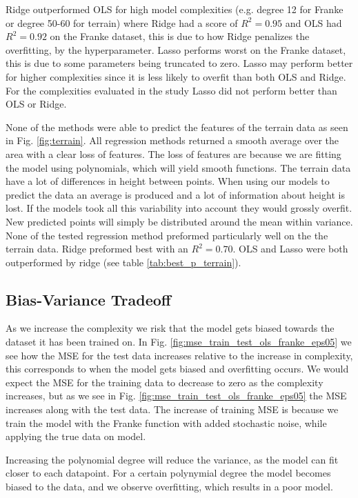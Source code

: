 \documentclass[%
 reprint,
nofootinbib,
 amsmath,amssymb,
 aps,
]{revtex4-2}
\begin{document}
Ridge outperformed OLS for high model complexities (e.g. degree 12 for Franke or degree 50-60 for terrain) where Ridge had a score of $R^2 = 0.95$ and OLS had $R^2 = 0.92$ on the Franke dataset, this is due to how Ridge penalizes the overfitting, by the hyperparameter. Lasso performs worst on the Franke dataset, this is due to some parameters being truncated to zero. Lasso may perform better for higher complexities since it is less likely to overfit than both OLS and Ridge. For the complexities evaluated in the study Lasso did not perform better than OLS or Ridge.

None of the methods were able to predict the features of the terrain data as seen in Fig. \ref{fig:terrain}. All regression methods returned a smooth average over the area with a clear loss of features. The loss of features are because we are fitting the model using polynomials, which will yield smooth functions. The terrain data have a lot of differences in height between points. When using our models to predict the data an average is produced and a lot of information about height is lost. If the models took all this variability into account they would grossly overfit. New predicted points will simply be distributed around the mean within variance. None of the tested regression method preformed particularly well on the the terrain data. Ridge preformed best with an $R^2 = 0.70$. OLS and Lasso were both outperformed by ridge (see table \ref{tab:best_p_terrain}).


\subsection{Bias-Variance Tradeoff}
As we increase the complexity we risk that the model gets biased towards the dataset it has been trained on. In Fig. \ref{fig:mse_train_test_ols_franke_eps05} we see how the MSE for the test data increases relative to the increase in complexity, this corresponds to when the model gets biased and overfitting occurs. We would expect the MSE for the training data to decrease to zero as the complexity increases, but as we see in Fig. \ref{fig:mse_train_test_ols_franke_eps05} the MSE increases along with the test data. The increase of training MSE is because we train the model with the Franke function with added stochastic noise, while applying the true data on model.

Increasing the polynomial degree will reduce the variance, as the model can fit closer to each datapoint. For a certain polynymial degree the model becomes biased to the data, and we observe overfitting, which results in a poor model.
\end{document}
